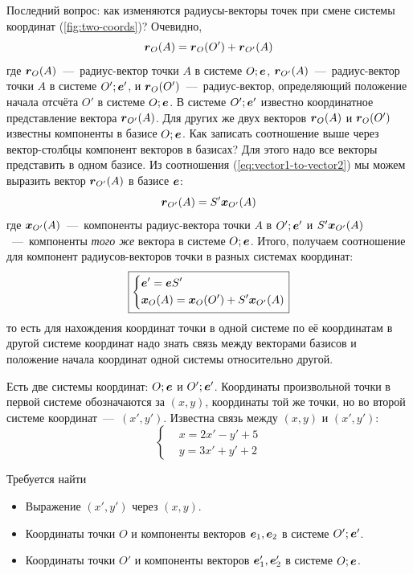 \documentclass[a4paper,12pt]{article}
\begin{document}
  Последний вопрос: как изменяются радиусы-векторы точек при смене системы координат (\ref{fig:two-coords})?
  Очевидно,
  \[
    \boldsymbol r_O(A) = \boldsymbol r_O(O') + \boldsymbol r_{O'}(A)
  \]
  где $\boldsymbol r_O(A)$~---~радиус-вектор точки $A$ в системе $O; \boldsymbol e$,
  $\boldsymbol r_{O'}(A)$~---~радиус-вектор точки $A$ в системе $O'; \boldsymbol e'$,
  и $\boldsymbol r_O(O')$~---~радиус-вектор, определяющий положение начала отсчёта $O'$ в системе $O; \boldsymbol e$.
  В системе $O'; \boldsymbol e'$ известно координатное представление вектора $ \boldsymbol r_{O'}(A)$.
  Для других же двух векторов $\boldsymbol r_O(A)$ и $\boldsymbol r_O(O')$ известны компоненты в базисе $O; \boldsymbol e$.
  Как записать соотношение выше через вектор-столбцы компонент векторов в базисах?
  Для этого надо все векторы представить в одном базисе.
  Из соотношения (\ref{eq:vector1-to-vector2}) мы можем выразить вектор $\boldsymbol r_{O'}(A)$ в базисе $\boldsymbol e$:
  \[
    \boldsymbol r_{O'}(A) = S' \boldsymbol x_{O'}(A)
  \]
  где $\boldsymbol x_{O'}(A)$~---~компоненты радиус-вектора точки $A$ в $O'; \boldsymbol e'$ и $S' \boldsymbol x_{O'}(A)$~---~компоненты \emph{того же} вектора в системе $O; \boldsymbol e$.
  Итого, получаем соотношение для компонент радиусов-векторов точки в разных системах координат:
  \begin{equation}\label{eq:point1-to-point2}
    \boxed{
      \left\{
        \begin{aligned}
          &\boldsymbol e' = \boldsymbol e S'\\
          &\boldsymbol x_O(A) = \boldsymbol x_O(O') + S' \boldsymbol x_{O'}(A)
        \end{aligned}
      \right.
    }
  \end{equation}
  то есть для нахождения координат точки в одной системе по её координатам в другой системе координат надо знать связь между векторами базисов и положение начала координат одной системы относительно другой.
  
  \begin{problem}[4.5]
    Есть две системы координат: $O; \boldsymbol e$ и $O'; \boldsymbol e'$.
    Координаты произвольной точки в первой системе обозначаются за $(x, y)$, координаты той же точки, но во второй системе координат~---~$(x', y')$.
    Известна связь между $(x, y)$ и $(x', y')$:
    \[
      \left\{
        \begin{aligned}
          &x = 2x' - y' + 5\\
          &y = 3x' + y' + 2
        \end{aligned}
      \right.
    \]
    
    Требуется найти
    \begin{itemize}
      \item Выражение $(x', y')$ через $(x, y)$.
      \item Координаты точки $O$ и компоненты векторов $\boldsymbol e_1, \boldsymbol e_2$ в системе $O'; \boldsymbol e'$.
      \item Координаты точки $O'$ и компоненты векторов $\boldsymbol e_1', \boldsymbol e_2'$ в системе $O; \boldsymbol e$.
    \end{itemize}
  \end{problem}
  
\end{document}
